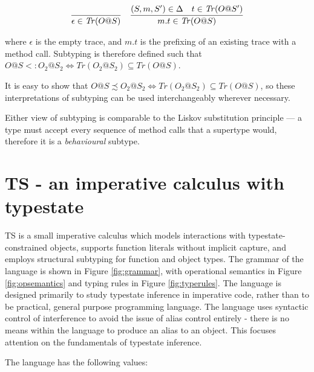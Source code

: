 \documentclass[preprint]{sigplanconf}
\newcommand{\Tr}{\mathit{Tr}}
\newcommand{\figref}[1]{Figure \ref{#1}}
\begin{document}
\[
\begin{tabular}{cc}
\infer{\epsilon \in \Tr(O@S)}{}
&
\infer{m . t \in \Tr(O@S)}
{(S, m, S') \in \Delta & t \in \Tr(O@S')}
\end{tabular}
\]

where $\epsilon$ is the empty trace, and $m . t$ is the 
prefixing of an existing trace with a method call.
Subtyping is therefore defined such that
$O@S <: O_2@S_2 \iff \Tr(O_2@S_2) \subseteq \Tr(O@S)$. 

It is easy to
show that $O@S \precsim O_2@S_2 \iff \Tr(O_2@S_2) \subseteq \Tr(O@S)$, so these
interpretations of subtyping can be used interchangeably wherever necessary.

Either view of subtyping is comparable to the Liskov substitution 
principle \cite{Liskov1987} --- a type must accept every sequence of
method calls that a supertype would, therefore it is a {\it behavioural}
subtype.

\section{TS - an imperative calculus with typestate}

TS is a small imperative calculus which models interactions with 
typestate-constrained objects, supports function literals without 
implicit capture, and employs structural subtyping for function and object
types.
The grammar of the language is shown 
in \figref{fig:grammar}, with operational semantics in \figref{fig:opsemantics} 
and typing rules in \figref{fig:typerules}.
The language is designed primarily
to study typestate inference in imperative code, rather than to 
be practical, general purpose programming language. The language uses syntactic 
control of interference \cite{Reynolds1978} to avoid the issue of alias control 
entirely - there is no means within the language to produce an alias to an 
object. This focuses attention on the fundamentals of typestate inference.

The language has the following values:
\end{document}

